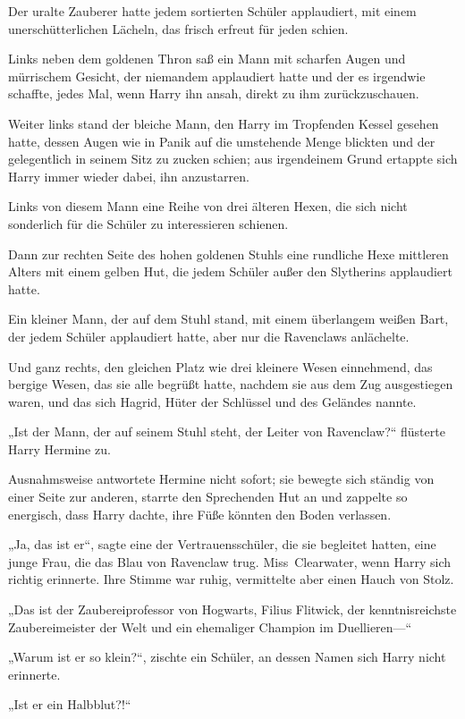 {Der uralte Zauberer hatte jedem sortierten Schüler applaudiert, mit einem unerschütterlichen Lächeln, das frisch erfreut für jeden schien.

Links neben dem goldenen Thron saß ein Mann mit scharfen Augen und mürrischem Gesicht, der niemandem applaudiert hatte und der es irgendwie schaffte, jedes Mal, wenn Harry ihn ansah, direkt zu ihm zurückzuschauen.

Weiter links stand der bleiche Mann, den Harry im Tropfenden Kessel gesehen hatte, dessen Augen wie in Panik auf die umstehende Menge blickten und der gelegentlich in seinem Sitz zu zucken schien; aus irgendeinem Grund ertappte sich Harry immer wieder dabei, ihn anzustarren.

Links von diesem Mann eine Reihe von drei älteren Hexen, die sich nicht sonderlich für die Schüler zu interessieren schienen.

Dann zur rechten Seite des hohen goldenen Stuhls eine rundliche Hexe mittleren Alters mit einem gelben Hut, die jedem Schüler außer den Slytherins applaudiert hatte.

Ein kleiner Mann, der auf dem Stuhl stand, mit einem überlangem weißen Bart, der jedem Schüler applaudiert hatte, aber nur die Ravenclaws anlächelte.

Und ganz rechts, den gleichen Platz wie drei kleinere Wesen einnehmend, das bergige Wesen, das sie alle begrüßt hatte, nachdem sie aus dem Zug ausgestiegen waren, und das sich Hagrid, Hüter der Schlüssel und des Geländes nannte.

„Ist der Mann, der auf seinem Stuhl steht, der Leiter von Ravenclaw?“ flüsterte Harry Hermine zu.

Ausnahmsweise antwortete Hermine nicht sofort; sie bewegte sich ständig von einer Seite zur anderen, starrte den Sprechenden Hut an und zappelte so energisch, dass Harry dachte, ihre Füße könnten den Boden verlassen.

„Ja, das ist er“, sagte eine der Vertrauensschüler, die sie begleitet hatten, eine junge Frau, die das Blau von Ravenclaw trug. Miss~Clearwater, wenn Harry sich richtig erinnerte. Ihre Stimme war ruhig, vermittelte aber einen Hauch von Stolz.

„Das ist der Zaubereiprofessor von Hogwarts, Filius Flitwick, der kenntnisreichste Zaubereimeister der Welt und ein ehemaliger Champion im Duellieren—“

„Warum ist er so klein?“, zischte ein Schüler, an dessen Namen sich Harry nicht erinnerte.

„Ist er ein Halbblut?!“

}
